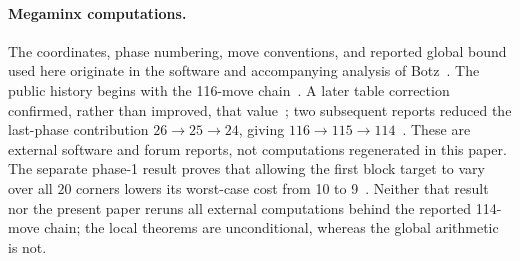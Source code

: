 \paragraph{Megaminx computations.}
The coordinates, phase numbering, move conventions, and reported global bound
used here originate in the software and accompanying analysis of
Botz~\cite{botz2026dataset,botzsource}.  The public history begins with the
116-move chain~\cite{botz2025bound116}.  A later table correction confirmed,
rather than improved, that value~\cite{botz2025correction}; two subsequent
reports reduced the last-phase contribution $26\to25\to24$, giving
$116\to115\to114$~\cite{rokicki2025bound115,rokicki2025bound114,botz2026bound114}.
These are external software and forum reports, not computations regenerated in
this paper.  The separate phase-1 result proves that allowing
the first block target to vary over all $20$ corners lowers its worst-case cost
from 10 to 9~\cite{kuznetsov2026phase1}.  Neither that result nor the present
paper reruns all external computations behind the reported 114-move chain;
the local theorems are unconditional, whereas the global arithmetic is not.
